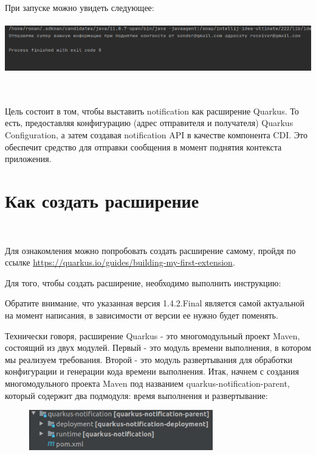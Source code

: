 \documentclass[russian,11pt]{article}
\begin{document}
При запуске можно увидеть следующее:

\paragraph{\includegraphics[scale=1.5, width=\textwidth]{2}}

~

Цель состоит в том, чтобы выставить notification как расширение Quarkus. То есть, предоставляя конфигурацию (адрес отправителя и получателя) Quarkus Configuration, а затем создавая notification  API в качестве компонента CDI. Это обеспечит средство для отправки сообщения в момент поднятия контекста приложения.

\section{Как создать расширение}
~

Для ознакомления можно попробовать создать расширение самому, пройдя по ссылке \url{https://quarkus.io/guides/building-my-first-extension}.
	
	Для того, чтобы создать расширение, необходимо выполнить инструкцию:



Обратите внимание, что указанная версия 1.4.2.Final является самой актуальной на момент написания, в зависимости от версии ее нужно будет поменять.

	Технически говоря, расширение Quarkus - это многомодульный проект Maven, состоящий из двух модулей. Первый - это модуль времени выполнения, в котором мы реализуем требования. Второй - это модуль развертывания для обработки конфигурации и генерации кода времени выполнения. Итак, начнем с создания многомодульного проекта Maven под названием quarkus-notification-parent, который содержит два подмодуля: время выполнения и развертывание:

\begin{figure}[H]
	\centering
	\includegraphics[scale=1, width=8cm]{3}
\end{figure}
\end{document}
